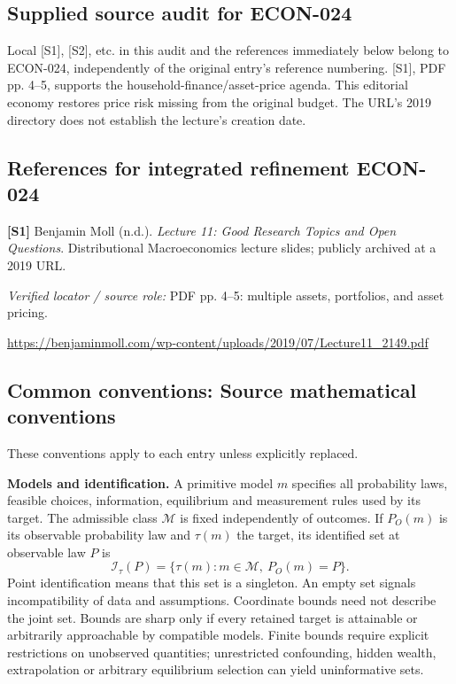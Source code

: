 \documentclass[11pt,a4paper]{article}
\begin{document}
\subsection*{Supplied source audit for ECON-024}
Local [S1], [S2], etc. in this audit and the references immediately below
belong to ECON-024, independently of the original entry's reference numbering.
[S1], PDF pp. 4--5, supports the household-finance/asset-price agenda. This editorial economy restores price risk missing from the original budget. The URL's 2019 directory does not establish the lecture's creation date.
\subsection*{References for integrated refinement ECON-024}
{\footnotesize\raggedright
\par\noindent\textbf{[S1]} Benjamin Moll (n.d.). \emph{Lecture 11: Good Research Topics and Open Questions}. Distributional Macroeconomics lecture slides; publicly archived at a 2019 URL.\par \textit{Verified locator / source role:} PDF pp. 4–5: multiple assets, portfolios, and asset pricing.\par \url{https://benjaminmoll.com/wp-content/uploads/2019/07/Lecture11_2149.pdf}\par\smallskip
}

\subsection*{Common conventions: Source mathematical conventions}

These conventions apply to each entry unless explicitly replaced.

\textbf{Models and identification.} A primitive model \(m\) specifies all probability laws, feasible choices, information, equilibrium and measurement rules used by its target. The admissible class \(\mathcal M\) is fixed independently of outcomes. If \(P_O(m)\) is its observable probability law and \(\tau(m)\) the target, its identified set at observable law \(P\) is
\[
 \mathcal I_\tau(P)=\{\tau(m):m\in\mathcal M,\ P_O(m)=P\}.
\]
Point identification means that this set is a singleton. An empty set signals incompatibility of data and assumptions. Coordinate bounds need not describe the joint set. Bounds are sharp only if every retained target is attainable or arbitrarily approachable by compatible models. Finite bounds require explicit restrictions on unobserved quantities; unrestricted confounding, hidden wealth, extrapolation or arbitrary equilibrium selection can yield uninformative sets.
\end{document}
